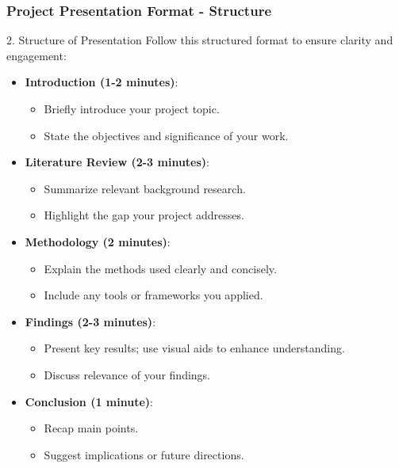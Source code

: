 \documentclass[aspectratio=169]{beamer}
\begin{document}
\begin{frame}[fragile]
    \frametitle{Project Presentation Format - Structure}
    \begin{block}{2. Structure of Presentation}
        Follow this structured format to ensure clarity and engagement:
        \begin{itemize}
            \item \textbf{Introduction (1-2 minutes)}:
                \begin{itemize}
                    \item Briefly introduce your project topic.
                    \item State the objectives and significance of your work.
                \end{itemize}
            \item \textbf{Literature Review (2-3 minutes)}:
                \begin{itemize}
                    \item Summarize relevant background research.
                    \item Highlight the gap your project addresses.
                \end{itemize}
            \item \textbf{Methodology (2 minutes)}:
                \begin{itemize}
                    \item Explain the methods used clearly and concisely.
                    \item Include any tools or frameworks you applied.
                \end{itemize}
            \item \textbf{Findings (2-3 minutes)}:
                \begin{itemize}
                    \item Present key results; use visual aids to enhance understanding.
                    \item Discuss relevance of your findings.
                \end{itemize}
            \item \textbf{Conclusion (1 minute)}:
                \begin{itemize}
                    \item Recap main points.
                    \item Suggest implications or future directions.
                \end{itemize}
        \end{itemize}
    \end{block}
\end{frame}
\end{document}
